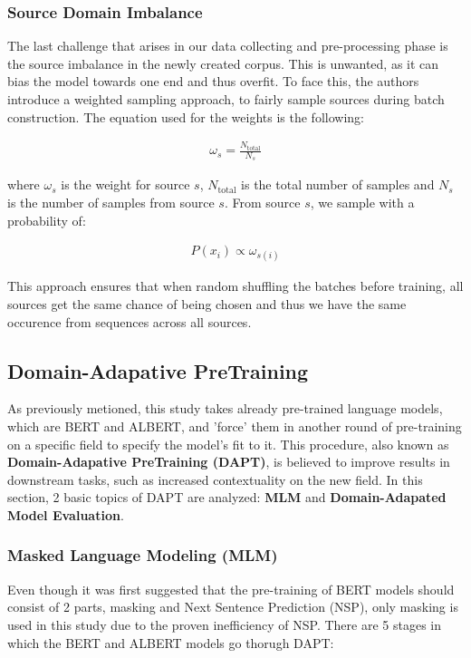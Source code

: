 \documentclass[a4paper,12pt]{article}
\begin{document}
\subsubsection{Source Domain Imbalance}
The last challenge that arises in our data collecting and pre-processing phase is the source imbalance in the newly created corpus. This is unwanted, as it can bias the model towards one end and thus overfit. To face this, the authors introduce a weighted sampling approach, to fairly sample sources during batch construction. The equation used for the weights is the following:

\begin{align}
\omega_s = \frac{N_{\text{total}}}{N_s}
\end{align}

where $\omega_s$ is the weight for source $s$, $N_{\text{total}}$ is the total number of samples and $N_s$ is the number of samples from source $s$. From source $s$, we sample with a probability of:

\begin{align}
P(x_i) \propto \omega_{s(i)}
\end{align}

This approach ensures that when random shuffling the batches before training, all sources get the same chance of being chosen and thus we have the same occurence from sequences across all sources.

\subsection{Domain-Adapative PreTraining}
As previously metioned, this study takes already pre-trained language models, which are BERT and ALBERT, and 'force' them in another round of pre-training on a specific field to specify the model's fit to it. This procedure, also known as \textbf{Domain-Adapative PreTraining (DAPT)}, is believed to improve results in downstream tasks, such as increased contextuality on the new field. In this section, 2 basic topics of DAPT are analyzed: \textbf{MLM} and \textbf{Domain-Adapated Model Evaluation}.

\subsubsection{Masked Language Modeling (MLM)}
Even though it was first suggested that the pre-training of BERT models should consist of 2 parts, masking and Next Sentence Prediction (NSP), only masking is used in this study due to the proven inefficiency of NSP. There are 5 stages in which the BERT and ALBERT models go thorugh DAPT:
\end{document}
